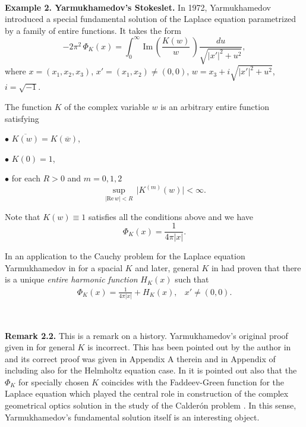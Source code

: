 $\quad$


{\bf\noindent Example 2. Yarmukhamedov's Stokeslet.}
In 1972, Yarmukhamedov \cite{Y1} introduced a special fundamental solution of the Laplace equation
parametrized by a family of entire functions.
It takes the form
$$\displaystyle
-2\pi^2\,\Phi_K(x)=\int_0^{\infty}\,\text{Im}\,\left(\frac{K(w)}{w}\,\right)\frac{du}{\sqrt{\vert x'\vert^2+u^2}},
\tag {2.5}
$$
where $x=(x_1,x_2,x_3)$, $x'=(x_1,x_2)\not=(0,0)$, $w=x_3+i\sqrt{\vert x'\vert^2+u^2}$, $i=\sqrt{-1}$.


The function $K$ of the complex variable $w$ is an arbitrary entire function satisfying

$\bullet$  $\overline{K(w)}=K(\overline{w})$,

$\bullet$  $K(0)=1$,


$\bullet$  for each $R>0$ and $m=0,1,2$
$$\displaystyle
\sup_{\vert\text{Re}\,w\vert<R}\,\vert K^{(m)}(w)\vert<\infty.
$$

\noindent
Note that $K(w)\equiv 1$ satisfies all the conditions above and we have
$$\displaystyle
\Phi_K(x)=\frac{1}{4\pi\vert x\vert}.
$$


In an application to the Cauchy problem for the Laplace equation 
Yarmukhamedov in \cite{Y2} for a spacial $K$ and later, general $K$ in \cite{Y4}
had proven that there is a unique {\it entire harmonic function} $H_K(x)$ such that
$$\begin{array}{ll}
\displaystyle
\Phi_K(x)=\frac{1}{4\pi\vert x\vert}+H_K(x), 
& 
x'\not=(0,0).
\end{array}
\tag {2.6}
$$


$\quad$


{\bf\noindent Remark 2.2.}  This is a remark on a history.
Yarmukhamedov's original proof given in \cite{Y3} for general $K$ is incorrect.  This has been pointed out 
by the author in \cite{Islab} and its correct proof was given 
in Appendix A therein and in Appendix of \cite{IProbeCarleman} including also for the Helmholtz equation case.
In \cite{Islab} it is pointed out also that the $\Phi_K$ for specially chosen $K$ coincides with 
the Faddeev-Green function for the Laplace equation which played the central role in construction
of the complex geometrical optics solution \cite{SU2} in the study of  the Calder\'on problem \cite{Cal}.  In this sense, 
Yarmukhamedov's fundamental solution itself  is an interesting object.  





$\quad$


